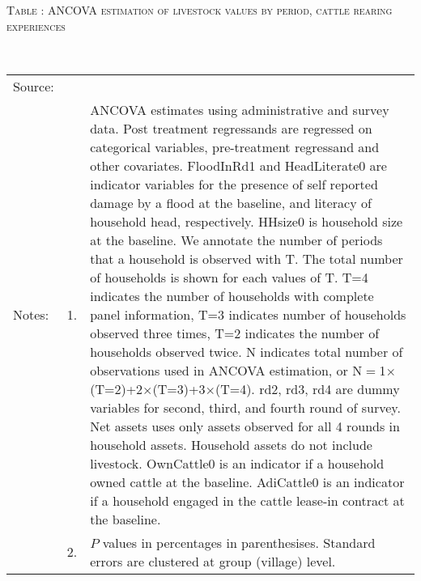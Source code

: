 \vspace{-1cm}\hspace{-1cm}\begin{minipage}[t]{14cm}
\hfil\textsc{\normalsize Table \thetable: ANCOVA estimation of livestock values by period, cattle rearing experiences\label{tab ANCOVA Livestock Experience timevarying}}\\
\setlength{\tabcolsep}{1pt}
\setlength{\baselineskip}{8pt}
\renewcommand{\arraystretch}{.52}
\hfil{}\\
\renewcommand{\arraystretch}{.8}
\setlength{\tabcolsep}{1pt}
\begin{tabular}{>{\hfill\scriptsize}p{1cm}<{}>{\hfill\scriptsize}p{.25cm}<{}>{\scriptsize}p{12cm}<{\hfill}}
Source:& \multicolumn{2}{l}{\scriptsize Estimated with GUK administrative and survey data.}\\
Notes: & 1. & ANCOVA estimates using administrative and survey data. Post treatment regressands are regressed on categorical variables, pre-treatment regressand and other covariates. \textsf{FloodInRd1} and \textsf{HeadLiterate0} are indicator variables for the presence of self reported damage by a flood at the baseline, and literacy of household head, respectively. \textsf{HHsize0} is household size at the baseline. We annotate the number of periods that a household is observed with \textsf{T}. The total number of households is shown for each values of \textsf{T}. \textsf{T=4} indicates the number of households with complete panel information, \textsf{T=3} indicates number of households observed three times, \textsf{T=2} indicates the number of households observed twice. \textsf{N} indicates total number of observations used in ANCOVA estimation, or \textsf{N$=$1$\times$(T=2)+2$\times$(T=3)+3$\times$(T=4)}.  \textsf{rd2, rd3, rd4} are dummy variables for second, third, and fourth round of survey. Net assets uses only assets observed for all 4 rounds in household assets. Household assets do not include livestock. \textsf{OwnCattle0} is an indicator if a household owned cattle at the baseline. \textsf{AdiCattle0} is an indicator if a household engaged in the cattle lease-in contract at the baseline.  \\
& 2. & $P$ values in percentages in parenthesises. Standard errors are clustered at group (village) level.
\end{tabular}
\end{minipage}


